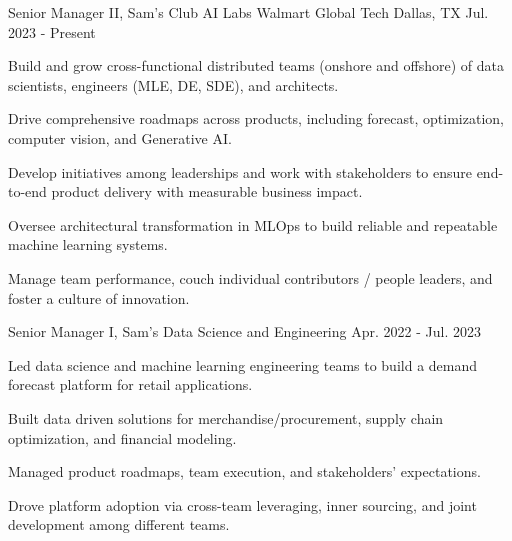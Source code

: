 

\begin{cventries}

	\cventry
		{Senior Manager II, Sam's Club AI Labs} %
		{Walmart Global Tech} %
		{Dallas, TX} %
		{Jul. 2023 - Present} %
		{
			\begin{cvitems} %
				\item {Build and grow cross-functional distributed teams (onshore and offshore) of data scientists, engineers (MLE, DE, SDE), and architects.}
				\item {Drive comprehensive roadmaps across products, including forecast, optimization, computer vision, and Generative AI.}
				\item {Develop initiatives among leaderships and work with stakeholders to ensure end-to-end product delivery with measurable business impact.}
				\item {Oversee architectural transformation in MLOps to build reliable and repeatable machine learning systems.}
				\item {Manage team performance, couch individual contributors / people leaders, and foster a culture of innovation.}
			\end{cvitems}
		}

	\cventry
		{Senior Manager I, Sam's Data Science and Engineering} %
		{} %
		{} %
		{Apr. 2022 - Jul. 2023} %
		{
			\begin{cvitems} %
				\item {Led data science and machine learning engineering teams to build a demand forecast platform for retail applications.}
				\item {Built data driven solutions for merchandise/procurement, supply chain optimization, and financial modeling.}
				\item {Managed product roadmaps, team execution, and stakeholders' expectations.}
				\item {Drove platform adoption via cross-team leveraging, inner sourcing, and joint development among different teams.}
			\end{cvitems}
	}



\end{cventries}
